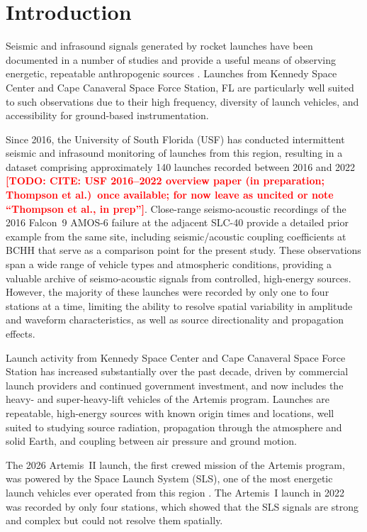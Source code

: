 \documentclass[]{seismica}
\newcommand{\todo}[1]{\textcolor{red}{\textbf{[TODO: #1]}}}
\begin{document}
\section{Introduction}

Seismic and infrasound signals generated by rocket launches have been
documented in a number of studies and provide a useful means of
observing energetic, repeatable anthropogenic sources
\citep[e.g.,][]{Kanamori1991,Hupe2019,Pilger2021,schuster_rocketquake_2025}.
Launches from Kennedy Space Center and Cape Canaveral Space Force
Station, FL are particularly well suited to such observations due to
their high frequency, diversity of launch vehicles, and accessibility
for ground-based instrumentation.

Since 2016, the University of South Florida (USF) has conducted
intermittent seismic and infrasound monitoring of launches from this
region, resulting in a dataset comprising approximately 140 launches
recorded between 2016 and 2022 \todo{CITE: USF 2016--2022 overview
paper (in preparation; Thompson et al.)\ once available; for now
leave as uncited or note ``Thompson et al., in prep''}. Close-range
seismo-acoustic recordings of the 2016 Falcon~9 AMOS-6 failure at the
adjacent SLC-40 \citep{thompson_amos6_2026} provide a detailed prior
example from the same site, including seismic/acoustic coupling
coefficients at BCHH that serve as a comparison point for the present
study. These observations span a wide range of vehicle types and
atmospheric conditions, providing a valuable archive of seismo-acoustic
signals from controlled, high-energy sources. However, the majority of
these launches were recorded by only one to four stations at a time,
limiting the ability to resolve spatial variability in amplitude and
waveform characteristics, as well as source directionality and
propagation effects.

Launch activity from Kennedy Space Center and Cape Canaveral Space
Force Station has increased substantially over the past decade, driven
by commercial launch providers and continued government investment, and
now includes the heavy- and super-heavy-lift vehicles of the Artemis
program. Launches are repeatable, high-energy sources with known origin
times and locations, well suited to studying source radiation,
propagation through the atmosphere and solid Earth, and coupling between
air pressure and ground motion.

The 2026 Artemis~II launch, the first crewed mission of the Artemis
program, was powered by the Space Launch System (SLS), one of the most
energetic launch vehicles ever operated from this region
\citep{NASA_SLS,Sutton2017}. The Artemis~I launch in 2022 was recorded
by only four stations, which showed that the SLS signals are strong and
complex but could not resolve them spatially.
\end{document}
